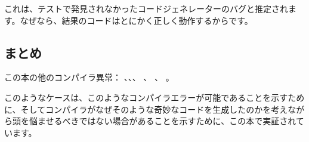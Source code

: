 これは、テストで発見されなかったコードジェネレーターのバグと推定されます。なぜなら、結果のコードはとにかく正しく動作するからです。



\subsection{まとめ}

この本の他のコンパイラ異常：
、、、
、
、
。

このようなケースは、このようなコンパイラエラーが可能であることを示すために、そしてコンパイラがなぜそのような奇妙なコードを生成したのかを考えながら頭を悩ませるべきではない場合があることを示すために、この本で実証されています。